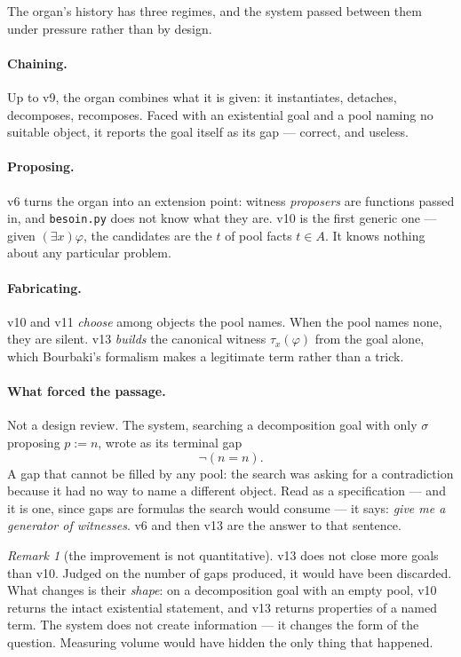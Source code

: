 \documentclass[11pt]{article}
\theoremstyle{remark}\newtheorem{remark}{Remark}
\begin{document}
The organ's history has three regimes, and the system passed between them under
pressure rather than by design.

\paragraph{Chaining.} Up to v9, the organ combines what it is given: it instantiates,
detaches, decomposes, recomposes. Faced with an existential goal and a pool naming no
suitable object, it reports the goal itself as its gap --- correct, and useless.

\paragraph{Proposing.} v6 turns the organ into an extension point: witness
\emph{proposers} are functions passed in, and \texttt{besoin.py} does not know what they
are. v10 is the first generic one --- given $(\exists x)\varphi$, the candidates are the
$t$ of pool facts $t \in A$. It knows nothing about any particular problem.

\paragraph{Fabricating.} v10 and v11 \emph{choose} among objects the pool names. When the
pool names none, they are silent. v13 \emph{builds} the canonical witness $\tau_x(\varphi)$
from the goal alone, which Bourbaki's formalism makes a legitimate term rather than a
trick.

\paragraph{What forced the passage.} Not a design review. The system, searching a
decomposition goal with only $\sigma$ proposing $p := n$, wrote as its terminal gap
\[ \neg(n = n) . \]
A gap that cannot be filled by any pool: the search was asking for a contradiction
because it had no way to name a different object. Read as a specification --- and it is
one, since gaps are formulas the search would consume --- it says: \emph{give me a
generator of witnesses}. v6 and then v13 are the answer to that sentence.

\begin{remark}[the improvement is not quantitative]\label{rem:shape}
v13 does not close more goals than v10. Judged on the number of gaps produced, it would
have been discarded. What changes is their \emph{shape}: on a decomposition goal with an
empty pool, v10 returns the intact existential statement, and v13 returns properties of a
named term. The system does not create information --- it changes the form of the
question. Measuring volume would have hidden the only thing that happened.
\end{remark}
\end{document}
